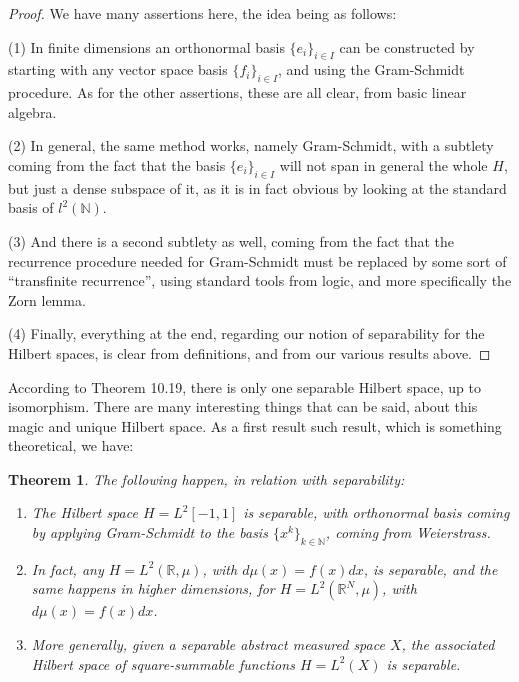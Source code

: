 \documentclass[12pt]{amsbook}
\newtheorem{theorem}{Theorem}[chapter]
\begin{document}
\begin{proof}
We have many assertions here, the idea being as follows:

\medskip

(1) In finite dimensions an orthonormal basis $\{e_i\}_{i\in I}$ can be constructed by starting with any vector space basis $\{f_i\}_{i\in I}$, and using the Gram-Schmidt procedure. As for the other assertions, these are all clear, from basic linear algebra.

\medskip

(2) In general, the same method works, namely Gram-Schmidt, with a subtlety coming from the fact that the basis $\{e_i\}_{i\in I}$ will not span in general the whole $H$, but just a dense subspace of it, as it is in fact obvious by looking at the standard basis of $l^2(\mathbb N)$. 

\medskip

(3) And there is a second subtlety as well, coming from the fact that the recurrence procedure needed for Gram-Schmidt must be replaced by some sort of ``transfinite recurrence'', using standard tools from logic, and more specifically the Zorn lemma.

\medskip

(4) Finally, everything at the end, regarding our notion of separability for the Hilbert spaces,  is clear from definitions, and from our various results above.
\end{proof}

According to Theorem 10.19, there is only one separable Hilbert space, up to isomorphism. There are many interesting things that can be said, about this magic and unique Hilbert space. As a first result such result, which is something theoretical, we have:


\begin{theorem}
The following happen, in relation with separability:
\begin{enumerate}
\item The Hilbert space $H=L^2[-1,1]$ is separable, with orthonormal basis coming by applying Gram-Schmidt to the basis $\{x^k\}_{k\in\mathbb N}$, coming from Weierstrass.

\item In fact, any $H=L^2(\mathbb R,\mu)$, with $d\mu(x)=f(x)dx$, is separable, and the same happens in higher dimensions, for $H=L^2(\mathbb R^N,\mu)$, with $d\mu(x)=f(x)dx$.

\item More generally, given a separable abstract measured space $X$, the associated Hilbert space of square-summable functions $H=L^2(X)$ is separable.
\end{enumerate}
\end{theorem}
 
\end{document}
